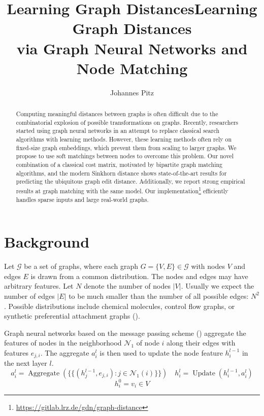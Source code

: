\documentclass[a4paper,10pt]{article}
\title{Learning Graph Distances} %
\author{Johannes Pitz} %
\institute{\textit{Guided Research: Data Analytics and Machine Learning Group  \protect\\ TUM Department of Informatics}}
\begin{document}
\title{Learning Graph Distances \protect\\ via Graph Neural Networks and Node Matching}
\maketitle

\begin{abstract}


Computing meaningful distances between graphs is often difficult due to the combinatorial explosion of possible transformations on graphs. Recently, researchers started using graph neural networks in an attempt to replace classical search algorithms with learning methods. However, these learning methods often rely on fixed-size graph embeddings, which prevent them from scaling to larger graphs. We propose to use soft matchings between nodes to overcome this problem. Our novel combination of a classical cost matrix, motivated by bipartite graph matching algorithms, and the modern Sinkhorn distance shows state-of-the-art results for predicting the ubiquitous graph edit distance. Additionally, we report strong empirical results at graph matching with the same model. Our implementation\footnote{\url{https://gitlab.lrz.de/gdn/graph-distance}} efficiently handles sparse inputs and large real-world graphs.


\end{abstract}



\section{Background}

Let $\mathcal{G}$ be a set of graphs, where each graph $G = \{V, E\} \in \mathcal{G}$ with nodes $V$ and edges $E$ is drawn from a common distribution. The nodes and edges may have arbitrary features. Let $N$ denote the number of nodes $\vert V \vert$. Usually we expect the number of edges $\vert E \vert$ to be much smaller than the number of all possible edges: $N^2$. Possible distributions include chemical molecules, control flow graphs, or synthetic preferential attachment graphs (\citealp{pref_att2002}).

Graph neural networks based on the message passing scheme (\citealp{gilmer2017}) aggregate the features of nodes in the neighborhood $\mathcal{N}_1$ of node $i$ along their edges with features $e_{j,i}$. The aggregate $a_i^l$ is then used to update the node feature $h_i^{l-1}$ in the next layer $l$.
\begin{equation}
    a_i^l = \operatorname{Aggregate}\left(\{\!\!\{(h_j^{l-1}, e_{j,i}) : j \in \mathcal{N}_1(i)\}\!\!\}\right) \quad
    h_i^l = \operatorname{Update}\left( h_i^{l-1}, a_i^l \right)
\end{equation}
\begin{equation}
    h_i^0 = v_i \in V
\end{equation}
\end{document}
